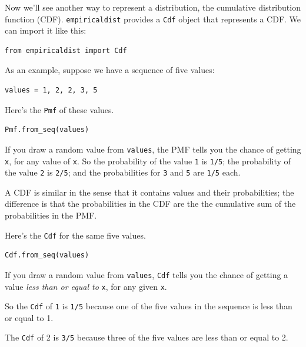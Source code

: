 Now we'll see another way to represent a distribution, the cumulative
distribution function (CDF). \passthrough{\lstinline!empiricaldist!}
provides a \passthrough{\lstinline!Cdf!} object that represents a CDF.
We can import it like this:

\begin{lstlisting}[]
from empiricaldist import Cdf
\end{lstlisting}

As an example, suppose we have a sequence of five values:

\begin{lstlisting}[]
values = 1, 2, 2, 3, 5  
\end{lstlisting}

Here's the \passthrough{\lstinline!Pmf!} of these values.

\begin{lstlisting}[]
Pmf.from_seq(values)
\end{lstlisting}

If you draw a random value from \passthrough{\lstinline!values!}, the
PMF tells you the chance of getting \passthrough{\lstinline!x!}, for any
value of \passthrough{\lstinline!x!}. So the probability of the value
\passthrough{\lstinline!1!} is \passthrough{\lstinline!1/5!}; the
probability of the value \passthrough{\lstinline!2!} is
\passthrough{\lstinline!2/5!}; and the probabilities for
\passthrough{\lstinline!3!} and \passthrough{\lstinline!5!} are
\passthrough{\lstinline!1/5!} each.

A CDF is similar in the sense that it contains values and their
probabilities; the difference is that the probabilities in the CDF are
the the cumulative sum of the probabilities in the PMF.

Here's the \passthrough{\lstinline!Cdf!} for the same five values.

\begin{lstlisting}[]
Cdf.from_seq(values)
\end{lstlisting}

If you draw a random value from \passthrough{\lstinline!values!},
\passthrough{\lstinline!Cdf!} tells you the chance of getting a value
\emph{less than or equal to} \passthrough{\lstinline!x!}, for any given
\passthrough{\lstinline!x!}.

So the \passthrough{\lstinline!Cdf!} of \passthrough{\lstinline!1!} is
\passthrough{\lstinline!1/5!} because one of the five values in the
sequence is less than or equal to 1.

The \passthrough{\lstinline!Cdf!} of 2 is \passthrough{\lstinline!3/5!}
because three of the five values are less than or equal to 2.

